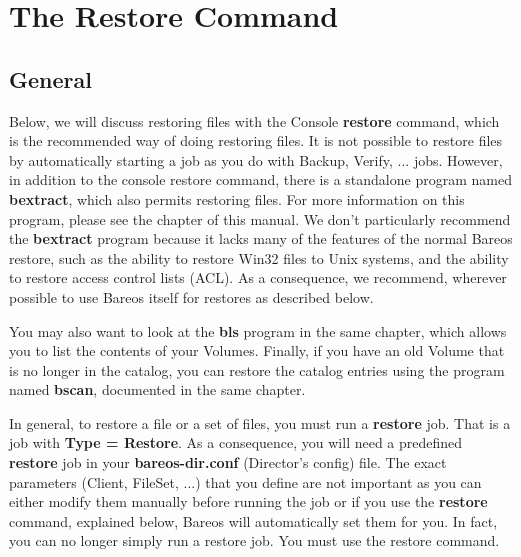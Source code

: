 \chapter{The Restore Command}
\label{RestoreChapter}
\label{_ConsoleChapter}

\section{General}

Below, we will discuss restoring files with the Console {\bf restore} command,
which is the recommended way of doing restoring files. It is not possible
to restore files by automatically starting a job as you do with Backup,
Verify, ... jobs.  However, in addition to the console restore command,
there is a standalone program named {\bf bextract}, which also permits
restoring files.  For more information on this program, please see the
 chapter of this manual. We
don't particularly recommend the {\bf bextract} program because it
lacks many of the features of the normal Bareos restore, such as the
ability to restore Win32 files to Unix systems, and the ability to
restore access control lists (ACL).  As a consequence, we recommend,
wherever possible to use Bareos itself for restores as described below.

You may also want to look at the {\bf bls} program in the same chapter,
which allows you to list the contents of your Volumes.  Finally, if you
have an old Volume that is no longer in the catalog, you can restore the
catalog entries using the program named {\bf bscan}, documented in the same
 chapter.

In general, to restore a file or a set of files, you must run a {\bf restore}
job. That is a job with {\bf Type = Restore}. As a consequence, you will need
a predefined {\bf restore} job in your {\bf bareos-dir.conf} (Director's
config) file. The exact parameters (Client, FileSet, ...) that you define are
not important as you can either modify them manually before running the job or
if you use the {\bf restore} command, explained below, Bareos will
automatically set them for you. In fact, you can no longer simply run a restore
job.  You must use the restore command.

